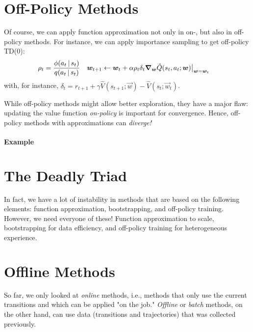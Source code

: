 	\section{Off-Policy Methods}
		Of course, we can apply function approximation not only in on-, but also in off-policy methods. For instance, we can apply importance sampling to get off-policy \acs{TD}(\(0\)):
		\begin{align}
			\rho_t &= \frac{\phi(a_t \,\vert\, s_t)}{q(a_t \,\vert\, s_t)} &
			\bm{w}_{t + 1} &\gets \bm{w}_t + \alpha \rho_t \delta_t \grad_{\bm{w}} \hat{Q}(s_t, a_t; \bm{w}) \bigr\rvert_{\bm{w} = \bm{w}_t}
		\end{align}
		with, for instance, \( \delta_t = r_{t + 1} + \gamma \hat{V}(s_{t + 1}; \vec{w}) - \hat{V}(s_t; \vec{w}_t) \).

		While off-policy methods might allow better exploration, they have a major flaw: updating the value function \emph{on-policy} is important for convergence. Hence, off-policy methods with approximations can \emph{diverge!}

		\paragraph{Example} %

	\section{The Deadly Triad}
		In fact, we have a lot of instability in methods that are based on the following elements: function approximation, bootstrapping, and off-policy training. However, we need everyone of these! Function approximation to scale, bootstrapping for data efficiency, and off-policy training for heterogeneous experience.

	\section{Offline Methods}
		So far, we only looked at \emph{online} methods, i.e., methods that only use the current transitions and which can be applied "on the job." \emph{Offline} or \emph{batch} methods, on the other hand, can use data (transitions and trajectories) that was collected previously.

